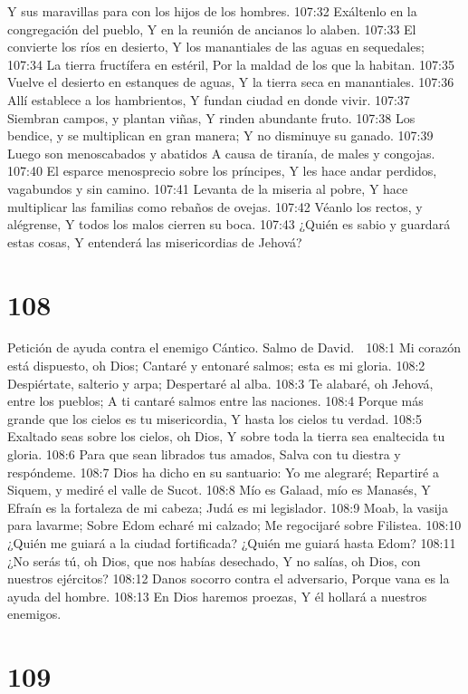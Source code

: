 Y sus maravillas para con los hijos de los hombres. 
107:32 Exáltenlo en la congregación del pueblo, 
Y en la reunión de ancianos lo alaben. 
107:33 El convierte los ríos en desierto, 
Y los manantiales de las aguas en sequedales; 
107:34 La tierra fructífera en estéril, 
Por la maldad de los que la habitan. 
107:35 Vuelve el desierto en estanques de aguas, 
Y la tierra seca en manantiales. 
107:36 Allí establece a los hambrientos, 
Y fundan ciudad en donde vivir. 
107:37 Siembran campos, y plantan viñas, 
Y rinden abundante fruto. 
107:38 Los bendice, y se multiplican en gran manera; 
Y no disminuye su ganado. 
107:39 Luego son menoscabados y abatidos 
A causa de tiranía, de males y congojas. 
107:40 El esparce menosprecio sobre los príncipes, 
Y les hace andar perdidos, vagabundos y sin camino. 
107:41 Levanta de la miseria al pobre, 
Y hace multiplicar las familias como rebaños de ovejas. 
107:42 Véanlo los rectos, y alégrense, 
Y todos los malos cierren su boca. 
107:43 ¿Quién es sabio y guardará estas cosas, 
Y entenderá las misericordias de Jehová? 

\chapter{108}

Petición de ayuda contra el enemigo 
Cántico. Salmo de David. 

108:1 Mi corazón está dispuesto, oh Dios; 
Cantaré y entonaré salmos; esta es mi gloria. 
108:2 Despiértate, salterio y arpa; 
Despertaré al alba. 
108:3 Te alabaré, oh Jehová, entre los pueblos; 
A ti cantaré salmos entre las naciones. 
108:4 Porque más grande que los cielos es tu misericordia, 
Y hasta los cielos tu verdad. 
108:5 Exaltado seas sobre los cielos, oh Dios, 
Y sobre toda la tierra sea enaltecida tu gloria. 
108:6 Para que sean librados tus amados, 
Salva con tu diestra y respóndeme. 
108:7 Dios ha dicho en su santuario: Yo me alegraré; 
Repartiré a Siquem, y mediré el valle de Sucot. 
108:8 Mío es Galaad, mío es Manasés, 
Y Efraín es la fortaleza de mi cabeza; 
Judá es mi legislador. 
108:9 Moab, la vasija para lavarme; 
Sobre Edom echaré mi calzado; 
Me regocijaré sobre Filistea. 
108:10 ¿Quién me guiará a la ciudad fortificada? 
¿Quién me guiará hasta Edom? 
108:11 ¿No serás tú, oh Dios, que nos habías desechado, 
Y no salías, oh Dios, con nuestros ejércitos? 
108:12 Danos socorro contra el adversario, 
Porque vana es la ayuda del hombre. 
108:13 En Dios haremos proezas, 
Y él hollará a nuestros enemigos. 

\chapter{109}

